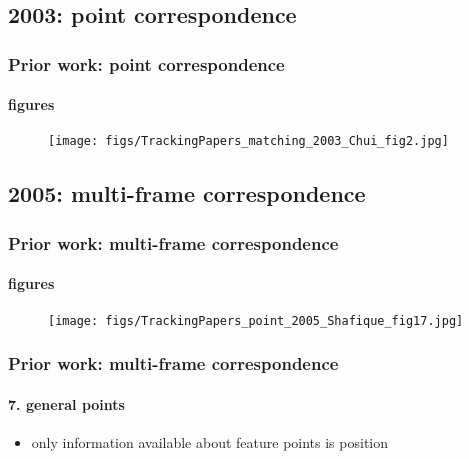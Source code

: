 \subsection{2003: point correspondence}
\begin{frame}
\frametitle{Prior work: point correspondence}
\framesubtitle{figures}
\mypagenum
{}
	\begin{figure}
		\texttt{[image: figs/TrackingPapers\_matching\_2003\_Chui\_fig2.jpg]}
	\end{figure}
\end{frame}


\subsection{2005: multi-frame correspondence}
\begin{frame}
\frametitle{Prior work: multi-frame correspondence}
\framesubtitle{figures}
\mypagenum
{}
	\begin{figure}
		\texttt{[image: figs/TrackingPapers\_point\_2005\_Shafique\_fig17.jpg]}
	\end{figure}
\end{frame}


\begin{frame}
\frametitle{Prior work: multi-frame correspondence}
\framesubtitle{7. general points}
\mypagenum
{}
	\begin{itemize}
		\item only information available about feature points is position	
	\end{itemize} 	
\end{frame}


\printbibliography

